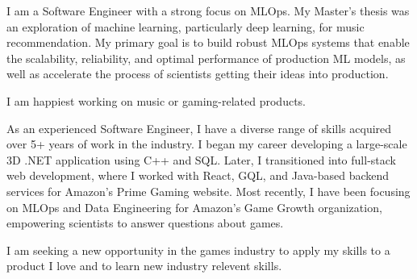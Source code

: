 \documentclass{cv}
\begin{document}
	\makecvheader

	\par{
		I am a Software Engineer with a strong focus on MLOps. My Master's thesis was an exploration of machine learning, particularly deep learning, for music recommendation. My primary goal is to build robust MLOps systems that enable the scalability, reliability, and optimal performance of production ML models, as well as accelerate the process of scientists getting their ideas into production. 
		
		I am happiest working on music or gaming-related products.

		As an experienced Software Engineer, I have a diverse range of skills acquired over 5+ years of work in the industry. I began my career developing a large-scale 3D .NET application using C++ and SQL. Later, I transitioned into full-stack web development, where I worked with React, GQL, and Java-based backend services for Amazon's Prime Gaming website. Most recently, I have been focusing on MLOps and Data Engineering for Amazon's Game Growth organization, empowering scientists to answer questions about games.
		
		I am seeking a new opportunity in the games industry to apply my skills to a product I love and to learn new industry relevent skills.
	}

	\bigskip
	
\end{document}
